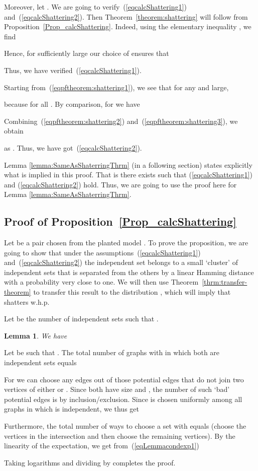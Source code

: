 \documentclass[a4paper,10pt]{article}
\makeatletter
\newcommand{\qed}{\hfill\smallskip}
\newtheorem{lemma}{Lemma}\renewcommand{\thelemma}{\arabic{lemma}}
\newenvironment{proof}{\noindent{\bf Proof\@:}}{\hfill \\}
\newcommand{\whp}{w.h.p.}
\newcommand\Prop{Proposition}
\newcommand\Thm{Theorem}
\makeatother
\begin{document}
Moreover, let .
We are going to verify~(\ref{eqcalcShattering1}) and~(\ref{eqcalcShattering2}).
Then \Thm~\ref{theorem:shattering} will follow from \Prop~\ref{Prop_calcShattering}.
Indeed, using the elementary inequality , we find
	
Hence, for  sufficiently large our choice of  ensures that
	
Thus, we have verified~(\ref{eqcalcShattering1}).

Starting from~(\ref{eqpftheorem:shattering1}), we see that for any  and  large,
	
because  for all .
By comparison, for  we have
	
Combining~(\ref{eqpftheorem:shattering2}) and~(\ref{eqpftheorem:shattering3}), we obtain
	
as .
Thus, we have got~(\ref{eqcalcShattering2}).

Lemma \ref{lemma:SameAsShaterringThrm} (in a following section)
states explicitly what is implied in this proof.  That is there
exists  such that (\ref{eqcalcShattering1}) and
(\ref{eqcalcShattering2}) hold.
Thus, we are going to use the proof here for Lemma 
\ref{lemma:SameAsShaterringThrm}.
\qed


\subsection{Proof of \Prop~\ref{Prop_calcShattering}}

Let  be a pair chosen from the planted model .
To prove the proposition, we are going to show that under the
assumptions~(\ref{eqcalcShattering1}) and~(\ref{eqcalcShattering2})
the independent set  belongs to a small `cluster' of
independent sets that is separated from the others by a linear
Hamming distance with a probability very close to one.
We will then use \Thm~\ref{thrm:transfer-theorem} to transfer
this result to the distribution , which will imply
that  shatters \whp


Let  be the number of independent sets 
such that
	.

\begin{lemma}\label{Lemma_condexp}
We have
	
\end{lemma}
\begin{proof}
Let  be such that . 
The total number of graphs with  in which both 
are independent sets equals
	
For we can choose any  edges out of those potential edges that
do not join two vertices of either  or .
Since both  have size  and ,
the number of such `bad' potential edges is 
by inclusion/exclusion.
Since  is chosen uniformly among all 
graphs in which  is independent, we thus get
	
Furthermore, the total number of ways to choose a set  with
 equals 	
(choose the  vertices in the intersection 
and then choose the remaining  vertices).
By the linearity of the expectation, we get from~(\ref{eqLemmacondexp1})
	
Taking logarithms and dividing by  completes the proof.
\end{proof}
\end{document}
